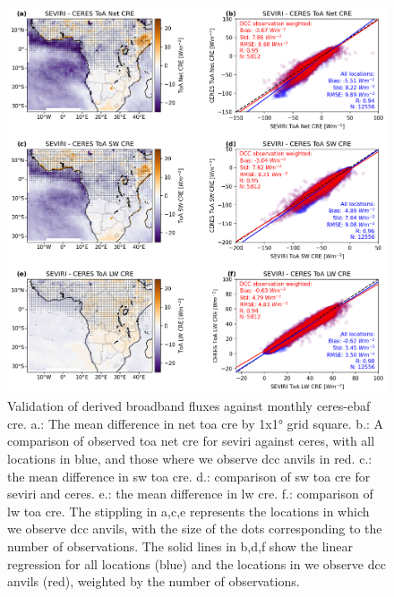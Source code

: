 \begin{figure}[t]
    \includegraphics[width=\textwidth]{figures/ch3_03.png}
    \caption[
    Validation of derived broadband fluxes against monthly \acrshort{ceres}-\acrshort{ebaf} \acrshort{cre}
    ]{
    Validation of derived broadband fluxes against monthly \acrshort{ceres}-\acrshort{ebaf} \acrshort{cre}. a.: The mean difference in net \acrshort{toa} \acrshort{cre} by 1x1° grid square. b.: A comparison of observed \acrshort{toa} net \acrshort{cre} for \acrshort{seviri} against \acrshort{ceres}, with all locations in blue, and those where we observe \acrshort{dcc} anvils in red. c.: the mean difference in \acrshort{sw} \acrshort{toa} \acrshort{cre}. d.: comparison of \acrshort{sw} \acrshort{toa} \acrshort{cre} for \acrshort{seviri} and \acrshort{ceres}. e.: the mean difference in \acrshort{lw} \acrshort{cre}. f.: comparison of \acrshort{lw} \acrshort{toa} \acrshort{cre}. The stippling in a,c,e represents the locations in which we observe \acrshort{dcc} anvils, with the size of the dots corresponding to the number of observations. The solid lines in b,d,f show the linear regression for all locations (blue) and the locations in we observe \acrshort{dcc} anvils (red), weighted by the number of observations.
    }
    \label{fig:flux_validation}
\end{figure}


